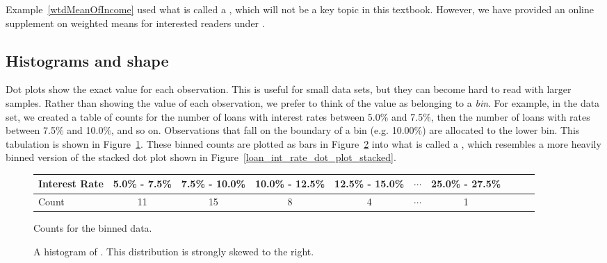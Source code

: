 Example~\ref{wtdMeanOfIncome} used what is called
a ,
which will not be a key topic in this textbook.
However, we have provided an online supplement on
weighted means for interested readers under
.



\subsection{Histograms and shape}
\label{histogramsAndShape}

Dot plots show the exact value for each observation.
This is useful for small data sets, but they can become
hard to read with larger samples. Rather than showing the
value of each observation, we prefer to think of the value
as belonging to a \emph{bin}.
For example, in the  data set, we created
a table of counts for the number of loans with interest
rates between 5.0\% and 7.5\%, then the number of loans
with rates between 7.5\% and 10.0\%, and so on.
Observations that fall on the boundary of a bin
(e.g. 10.00\%) are allocated to the lower bin.
This tabulation is shown in Figure~\ref{binnedIntRateAmountTable}.
These binned counts are plotted as bars in
Figure~\ref{loan50IntRateHist} into what is called
a , which resembles a more heavily binned
version of the stacked dot plot shown in
Figure~\ref{loan_int_rate_dot_plot_stacked}.

\begin{figure}[ht]
\centering\small
\begin{tabular}{l ccc ccc ccc}
  \hline
  Interest Rate &
      5.0\% - 7.5\% &
      7.5\% - 10.0\% &
      10.0\% - 12.5\% &
      12.5\% - 15.0\% &
      $\cdots$ &
      25.0\% - 27.5\% \\
  \hline
  Count & 11 & 15 & 8 & 4 & $\cdots$ & 1 \\
  \hline
\end{tabular}
\caption{Counts for the binned
     data.}
\label{binnedIntRateAmountTable}
\end{figure}

\begin{figure}[bth]
  \centering
  \caption{A histogram of .
      This distribution is strongly skewed to the right.
      }
  \label{loan50IntRateHist}
\end{figure}

